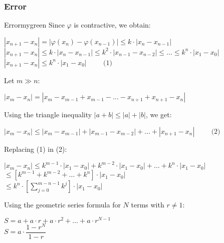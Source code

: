 \vspace{0.45cm}
\subsubsection{Error}
\begin{prettyBox}{Error}{mygreen}
Since \(\varphi\) is contractive, we obtain:

\begin{center}
    \(|x_{n+1} - x_n| = |\varphi(x_n) - \varphi(x_{n-1})| \leq k\cdot|x_{n}- x_{n-1}|\)\\[0.15cm] 
    \(|x_{n+1} - x_n| \leq k\cdot|x_{n} - x_{n-1}|  \leq k^2\cdot|x_{n-1}- x_{n-2}| \leq \dots \leq k^n \cdot |x_1 - x_0|\)\\[0.15cm]
    \(\boxed{|x_{n+1} - x_{n}| \leq k^n \cdot |x_1 - x_0|} \hspace{1cm} \text{(1)}\)
\end{center}

Let \(m \gg n\):
\begin{center}
    \(|x_{m} - x_{n}| =  |x_m - x_{m-1} + x_{m-1} - \dots - x_{n+1} + x_{n+1} - x_n|\)
\end{center}

Using the triangle inequality \(|a+b| \leq |a| + |b|\), we get:

\begin{center}
    \(\boxed{|x_{m} - x_{n}| \leq  |x_m - x_{m-1}| + |x_{m-1} - x_{m-2}| + \dots + |x_{n+1} - x_n|} \hspace{1cm} \text{(2)}\)
\end{center}

Replacing (1) in (2):

\begin{center}
    \(|x_{m} - x_{n}| \leq k^{m-1} \cdot|x_1 - x_0| + k^{m-2}\cdot |x_{1} - x_{0}| + \dots + k^{n}\cdot| x_{1} - x_0|\)\\[0.15cm]
    \hspace{-1.5cm} \(\leq [k^{m-1} + k^{m-2} + \dots + k^{n}] \cdot| x_{1} - x_0|\)\\[0.15cm]
    \hspace{-2.9cm}\(\leq k^{n} \cdot \left[\sum\limits_{j=0}^{m-n-1} k^j \right] \cdot| x_{1} - x_0|\)
\end{center}

Using the geometric series formula for \(N\) terms with \(r \neq 1\):
\begin{center}
    \(S = a + a\cdot r + a\cdot r^2 + \dots + a\cdot r^{N-1}\)\\[0.2cm]
    \(S = a\cdot \dfrac{1-r^{N}}{1-r}\)
\end{center}


\end{prettyBox}
